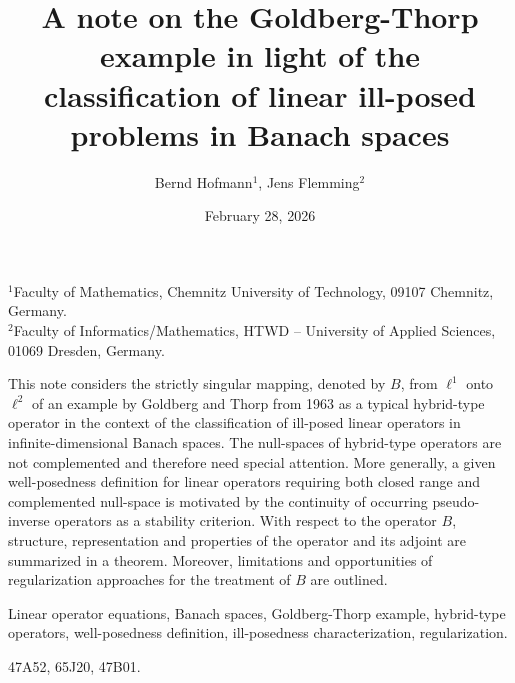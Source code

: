 \documentclass[12pt,twoside,reqno]{amsart}
\theoremstyle{definition}
\numberwithin{equation}{section}
\begin{document}
\setcounter{page}{1}







\vspace*{2.0cm}
\title[Goldberg-Thorp example in light of ill-posedness classification]
{A note on the Goldberg-Thorp example in light of the classification of linear ill-posed problems in Banach spaces}
\author[Bernd Hofmann and Jens Flemming]{Bernd Hofmann$^1$, Jens Flemming$^2$}
\date{February 28, 2026}
\maketitle
\vspace*{-0.6cm}


\begin{center}
{\footnotesize
$^1$Faculty of Mathematics, Chemnitz University of Technology, 09107 Chemnitz, Germany.\\
$^2$Faculty of Informatics/Mathematics, HTWD -- University of Applied Sciences, 01069 Dresden, Germany.
}\end{center}


\medskip

\vskip 4mm {\footnotesize {}
This note considers the strictly singular mapping, denoted by $B$, from $\ell^1$ onto $\ell^2$ of an example by Goldberg and Thorp from 1963 as a typical hybrid-type operator in the context of the classification of ill-posed linear operators in infinite-dimensional Banach spaces. The null-spaces of hybrid-type operators are not complemented and therefore need special attention. More generally, a given well-posedness definition for linear operators requiring both closed range and complemented null-space is motivated by the continuity of occurring pseudo-inverse operators as a stability criterion. With respect to the operator $B$, structure, representation and properties of the operator and its adjoint are summarized in a theorem. Moreover, limitations and opportunities of regularization approaches for the treatment of $B$ are outlined.

\bigskip

Linear operator equations, Banach spaces, Goldberg-Thorp example, hybrid-type operators, well-posedness definition, ill-posedness characterization, regularization.

\medskip

47A52, 65J20, 47B01.

}
\end{document}
